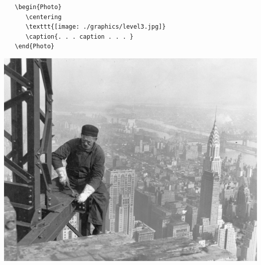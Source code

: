  \begin{Example}
 \begin{verbatim}
   \begin{Photo}
      \centering
      \texttt{[image: ./graphics/level3.jpg]}
      \caption{. . . caption . . . }
   \end{Photo}
\end{verbatim}
\caption{Example using verbatim code}
 \end{Example}

\begin{Photo}
 \centering
 \includegraphics[width=0.85\linewidth]{./images/old-timer-structural-worker.jpg}
\caption{. . . caption . . . }
\end{Photo}

\newlength{\egwidth}\setlength{\egwidth}{0.48\textwidth}

\newenvironment{ega}%
{\begin{list}{}{\setlength{\leftmargin}{0.02\textwidth}%
\setlength{\rightmargin}{\leftmargin}}\item[]\footnotesize}%
{\end{list}}

\newenvironment{egbox}%
{\begin{minipage}[t]{\egwidth}}%
{\end{minipage}}

\newcommand{\egstart}{\begin{ega}\begin{egbox}}
\newcommand{\egmid}{\end{egbox}\hfill\begin{egbox}}
\newcommand{\egend}{\end{egbox}\end{ega}}

